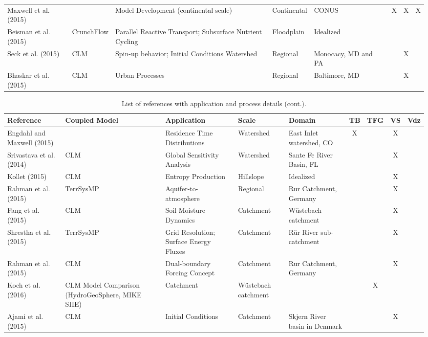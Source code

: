 {\begin{table}
\begin{tabular}{ l  p{1.5cm} p{2cm} p{1.5cm} p{1.5cm} | c | c | c | c }
\cite{Maxwell2015} Maxwell et al. (2015)& & Model Development (continental-scale) & Continental & CONUS   & &X &X & X \\			
\cite{Beisman2015} Beisman et al. (2015)& CrunchFlow & Parallel Reactive Transport; Subsurface Nutrient Cycling & Floodplain& Idealized  & & & &      \\		
\cite{Seck2015} Seck et al. (2015) & CLM & Spin-up behavior; Initial Conditions	Watershed & Regional& Monocacy, MD and PA	& & & X	& \\
\cite{Bhaskar2015} Bhaskar et al. (2015)& CLM & Urban Processes & Regional & Baltimore, MD                      & & & X & \\	
\end{tabular}
\label{pfref1}
\end{table}

\begin{table} \center
\renewcommand{\arraystretch}{2.5}
\center
\caption{List of \parflow{} references with application and process details (cont.).}

\begin{tabular}{ l  p{1.5cm} p{2cm} p{1.5cm} p{1.5cm} | c | c | c | c }
\bf{Reference} & \bf{Coupled Model} & \bf{Application} & \bf{Scale} & \bf{Domain} & \bf{TB} & \bf{TFG} & \bf{VS} & \bf{Vdz} \\   
\hline{}

\cite{Engdahl2015} Engdahl and Maxwell (2015) & & Residence Time Distributions & Watershed& East Inlet watershed, CO  & X& &X &  \\		
\cite{Srivastava2014} Srivastava et al. (2014)& CLM & Global Sensitivity Analysis & Watershed & Sante Fe River Basin, FL   & & & X & \\
\cite{Kollet2015} Kollet (2015) & CLM & Entropy Production & Hillslope & Idealized     & & & X & \\	
\cite{Rahman2015a} Rahman et al. (2015)& TerrSysMP & Aquifer-to-atmosphere & Regional & Rur Catchment, Germany & & & X & \\	
\cite{Fang2015} Fang et al. (2015) & CLM & Soil Moisture Dynamics & Catchment & W{\"u}stebach catchment   & & & X & \\	
\cite{Shrestha2015} Shrestha et al. (2015) & TerrSysMP & Grid Resolution; Surface Energy Fluxes & Catchment & R{\"u}r River sub-catchment  & & & X & \\	
\cite{Rahman2015} Rahman et al. (2015) & CLM & Dual-boundary Forcing Concept & Catchment & Rur Catchment, Germany & & & X & \\	
\cite{Koch2016} Koch et al. (2016) &CLM	Model Comparison (HydroGeoSphere, MIKE SHE) & Catchment& W{\"u}stebach catchment & & & X & \\	
\cite{Ajami2015} Ajami et al. (2015)& CLM& Initial Conditions& Catchment& Skjern River basin in Denmark  & & & X & \\
\end{tabular}
\label{pfref2}
\end{table}

}
